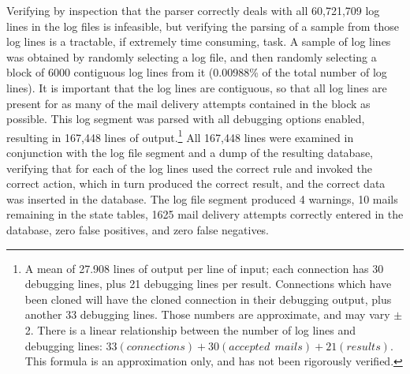 
Verifying by inspection that the parser correctly deals with all 60,721,709
log lines in the \numberOFlogFILES{} log files is infeasible, but verifying
the parsing of a sample from those log lines is a tractable, if extremely
time consuming, task.  A sample of log lines was obtained by randomly
selecting a log file, and then randomly selecting a block of 6000
contiguous log lines from it (0.00988\% of the total number of log lines).
It is important that the log lines are contiguous, so that all log lines
are present for as many of the mail delivery attempts contained in the
block as possible.  This log segment was parsed with all debugging options
enabled, resulting in 167,448 lines of output.\footnote{A mean of 27.908
lines of output per line of input; each connection has 30 debugging lines,
plus 21 debugging lines per result.  Connections which have been cloned
will have the cloned connection in their debugging output, plus another 33
debugging lines.  Those numbers are approximate, and may vary $\pm{}$ 2.
There is a linear relationship between the number of log lines and
debugging lines: $33(connections) + 30(accepted~~mails) + 21(results)$.
This formula is an approximation only, and has not been rigorously
verified.}  All 167,448 lines were examined in conjunction with the log
file segment and a dump of the resulting database, verifying that for each
of the log lines \parsername{} used the correct rule and invoked the
correct action, which in turn produced the correct result, and the correct
data was inserted in the database.  The log file segment produced 4
warnings, 10 mails remaining in the state tables, 1625 mail delivery
attempts correctly entered in the database, zero false positives, and zero
false negatives.

